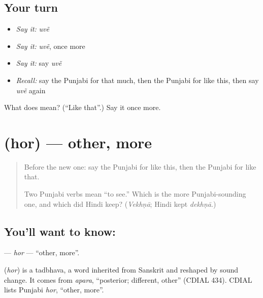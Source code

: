 \subsection*{Your turn}
\begin{itemize}
\raggedright
  \item \emph{Say it:} \emph{uvẽ}
  \item \emph{Say it:} \emph{uvẽ}, once more
  \item \emph{Say it:} say \emph{uvẽ}
  \item \emph{Recall:} say the Punjabi for that much, then the Punjabi for like this, then say \emph{uvẽ} again
\end{itemize}

\begin{tcolorbox}[breakable,colback=teal!4,colframe=teal!35!black,title={Before you move on}]
What does  mean? (\textquotedblleft{}Like that\textquotedblright{}.) Say it once more.
\end{tcolorbox}
\section[\texorpdfstring{\pa{ਹੋਰ} (hor)}{ਹੋਰ (hor)}]{ (hor) — other, more}

\label{lesson:PA-C108-hor}



\begin{quote}
Before the new one: say the Punjabi for like this, then the Punjabi for like that.

Two Punjabi verbs mean \textquotedblleft{}to see.\textquotedblright{} Which is the more Punjabi-sounding one, and which did Hindi keep? (\emph{Vekhṇā}; Hindi kept \emph{dekhṇā}.)
\end{quote}

\subsection*{You'll want to know: }
\textbf{} — \emph{hor} — \textquotedblleft{}other, more\textquotedblright{}.

\begin{cousinweb}
\textbf{} (\emph{hor}) is a tadbhava, a word inherited from Sanskrit and reshaped by sound change. It comes from \emph{apara}, \textquotedblleft{}posterior; different, other\textquotedblright{} (CDIAL 434). CDIAL lists Punjabi \emph{hor}, \textquotedblleft{}other, more\textquotedblright{}.
\end{cousinweb}

